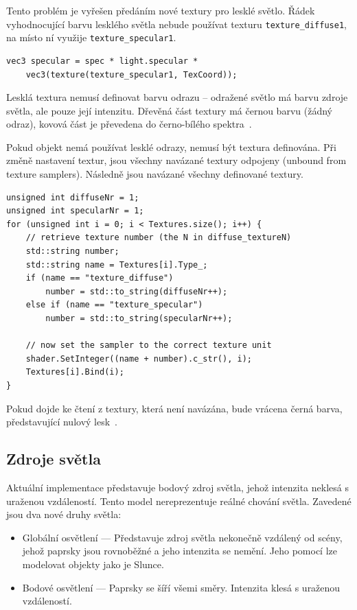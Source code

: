 \documentclass[thesis=M,czech]{FITthesis}[2019/12/23]
\begin{document}
Tento problém je vyřešen předáním nové textury pro lesklé světlo. Řádek vyhodnocující barvu lesklého světla nebude používat texturu \texttt{texture\_diffuse1}, na místo ní využije \texttt{texture\_specular1}.

\begin{verbatim}
vec3 specular = spec * light.specular * 
    vec3(texture(texture_specular1, TexCoord));
\end{verbatim}

Lesklá textura nemusí definovat barvu odrazu -- odražené světlo má barvu zdroje světla, ale pouze její intenzitu. Dřevěná část textury má černou barvu (žádný odraz), kovová část je převedena do černo-bílého spektra~\cite{lopgl_light_maps}.

Pokud objekt nemá používat lesklé odrazy, nemusí být textura definována. Při změně nastavení textur, jsou všechny navázané textury odpojeny (unbound from texture samplers). Následně jsou navázané všechny definované textury.

\begin{verbatim}
unsigned int diffuseNr = 1;
unsigned int specularNr = 1;
for (unsigned int i = 0; i < Textures.size(); i++) {
    // retrieve texture number (the N in diffuse_textureN)
    std::string number;
    std::string name = Textures[i].Type_;
    if (name == "texture_diffuse")
        number = std::to_string(diffuseNr++);
    else if (name == "texture_specular")
        number = std::to_string(specularNr++);

    // now set the sampler to the correct texture unit
    shader.SetInteger((name + number).c_str(), i);
    Textures[i].Bind(i);
}
\end{verbatim}

Pokud dojde ke čtení z textury, která není navázána, bude vrácena černá barva, představující nulový lesk~\cite{unbound_texture}.

\subsection{Zdroje světla}

Aktuální implementace představuje bodový zdroj světla, jehož intenzita neklesá s uraženou vzdáleností. Tento model nereprezentuje reálné chování světla. Zavedené jsou dva nové druhy světla:

\begin{itemize}
\item Globální osvětlení --- Představuje zdroj světla nekonečně vzdálený od scény, jehož paprsky jsou rovnoběžné a jeho intenzita se nemění. Jeho pomocí lze modelovat objekty jako je Slunce. 

\item Bodové osvětlení --- Paprsky se šíří všemi směry. Intenzita klesá s uraženou vzdáleností.
\end{itemize}
\end{document}
